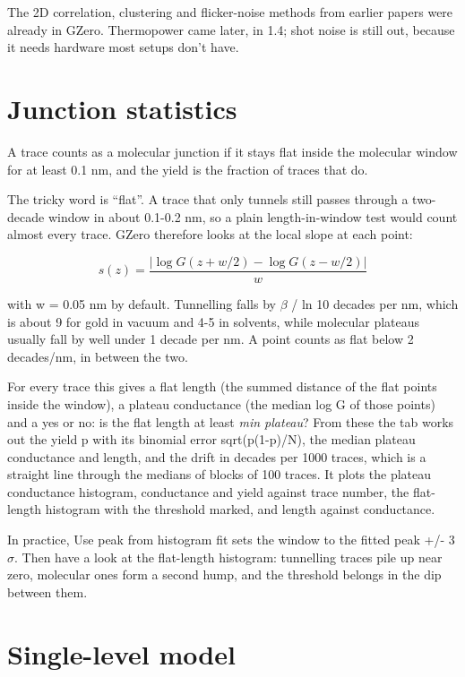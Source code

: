\documentclass[
  11pt,
  a4paper,
]{article}
\begin{document}
The 2D correlation, clustering and flicker-noise methods from earlier
papers were already in GZero. Thermopower came later, in 1.4; shot noise
is still out, because it needs hardware most setups don't have.

\hypertarget{junction-statistics}{%
\section{Junction statistics}\label{junction-statistics}}

A trace counts as a molecular junction if it stays flat inside the
molecular window for at least 0.1 nm, and the yield is the fraction of
traces that do.

The tricky word is ``flat''. A trace that only tunnels still passes
through a two-decade window in about 0.1-0.2 nm, so a plain
length-in-window test would count almost every trace. GZero therefore
looks at the local slope at each point:

\[
s(z) = \frac{|\log G(z + w/2) - \log G(z - w/2)|}{w}
\]

with w = 0.05 nm by default. Tunnelling falls by $\beta$ / ln 10 decades
per nm, which is about 9 for gold in vacuum and 4-5 in solvents, while
molecular plateaus usually fall by well under 1 decade per nm. A point
counts as flat below 2 decades/nm, in between the two.

For every trace this gives a flat length (the summed distance of the
flat points inside the window), a plateau conductance (the median log G
of those points) and a yes or no: is the flat length at least \emph{min
plateau}? From these the tab works out the yield p with its binomial
error sqrt(p(1-p)/N), the median plateau conductance and length, and the
drift in decades per 1000 traces, which is a straight line through the
medians of blocks of 100 traces. It plots the plateau conductance
histogram, conductance and yield against trace number, the flat-length
histogram with the threshold marked, and length against conductance.

In practice, Use peak from histogram fit sets the window to the fitted
peak +/- 3 $\sigma$. Then have a look at the flat-length histogram:
tunnelling traces pile up near zero, molecular ones form a second hump,
and the threshold belongs in the dip between them.

\hypertarget{single-level-model}{%
\section{Single-level model}\label{single-level-model}}
\end{document}
